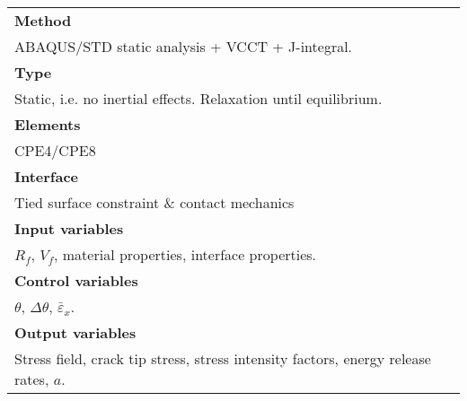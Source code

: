 \begin{table}[h!]
\scriptsize
  \centering
    \begin{tabularx}{\textwidth}{X}
    \toprule
    \midrule    
    \textbf{Method}\\
    ABAQUS/STD static analysis + VCCT + J-integral.\\
    \midrule
    \textbf{Type}\\
    Static, i.e. no inertial effects. Relaxation until equilibrium.\\
    \midrule
    \textbf{Elements}\\
    CPE4/CPE8\\
    \midrule
    \textbf{Interface}\\
    Tied surface constraint \& contact mechanics\\
    \midrule
   \textbf{Input variables}\\
    $R_{f}$, $V_{f}$, material properties, interface properties.\\
    \midrule
    \textbf{Control variables}\\
    $\theta$, $\Delta\theta$, $\bar{\varepsilon}_{x}$.\\
    \midrule
 \textbf{Output variables} \\
  Stress field, crack tip stress, stress intensity factors, energy release rates, $a$.\\
  \midrule
    \bottomrule
    \end{tabularx}%
  \label{tab:analysis_tab}%
\end{table}%
